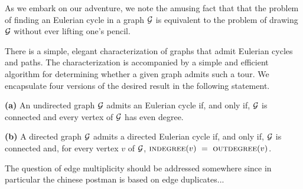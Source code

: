 As we embark on our adventure, we note the amusing fact that
that the problem of finding an Eulerian cycle in a graph $\mbox{$\cal G$}$ is
equivalent to the problem of drawing $\mbox{$\cal G$}$ without ever lifting one's
pencil. 

\medskip

There is a simple, elegant characterization of graphs that admit Eulerian cycles and paths.
The characterization is accompanied by a simple and efficient algorithm for determining
whether a given graph admits such a tour.  We encapsulate four versions of the
desired result in the following statement.

\begin{prop}
\label{thm:eulerian-cycle}
{\bf (a)}
An undirected graph $\mbox{$\cal G$}$ admits an Eulerian cycle if, and only if,
$\mbox{$\cal G$}$ is connected and every vertex of $\mbox{$\cal G$}$ has even degree.

{\bf (b)}
A directed graph $\mbox{$\cal G$}$ admits a directed Eulerian cycle if, and only if,
$\mbox{$\cal G$}$ is connected and, for every vertex $v$ of $\mbox{$\cal G$}$,
$\mbox{\sc indegree}(v) \ = \ \mbox{\sc outdegree}(v)$.
\end{prop}

{\Denis The question of edge multiplicity should be addressed somewhere since in particular
the chinese postman is based on edge duplicates...}

